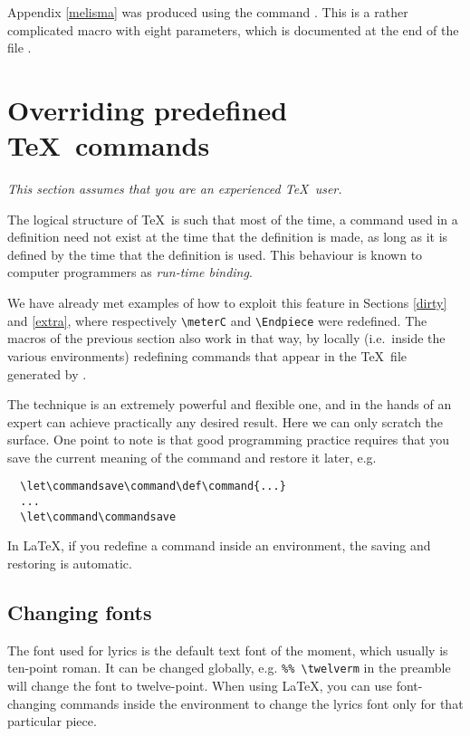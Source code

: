 \documentclass[11pt]{article}
\begin{document}
Appendix \ref{melisma} was produced using the command .
This is a rather complicated macro with eight parameters, which is
documented at the end of the file .
 
\section{Overriding predefined \TeX\ commands}  

\textit{This section assumes that you are an experienced \TeX\
user. }

The logical structure of \TeX\ is such that most of the time, a command used
in a definition need not exist at the time that the definition is made,
as long as it is defined by the time that the definition is used.  This
behaviour is known to computer programmers as \emph{run-time binding}.

We have already met examples of how to exploit this feature in Sections
\ref{dirty} and \ref{extra}, where respectively \verb"\meterC" and
\verb"\Endpiece" were redefined. 
The macros of the previous section also work in that way, by locally
(i.e.\ inside the various environments) redefining commands that appear
in the \TeX\ file generated by \PMX.

The technique is an extremely powerful and flexible one, and in the
hands of an expert can achieve practically any desired result.  
Here we can only scratch the surface.  One point to note is that
good programming practice requires that you save the current meaning
of the command and restore it later, e.g.
\begin{verbatim}
  \let\commandsave\command\def\command{...}
  ...
  \let\command\commandsave
\end{verbatim}
In \LaTeX, if you redefine a command inside an environment, the saving and
restoring is automatic.

\subsection{Changing fonts}

The font used for lyrics is the default text font of the moment,
which usually is ten-point roman.
It can be changed globally, e.g. 
\verb"%% \twelverm" in the preamble will change the font to
twelve-point.  When using \LaTeX, you can use font-changing commands
inside the environment to change the lyrics font only for that
particular piece.
\end{document}
